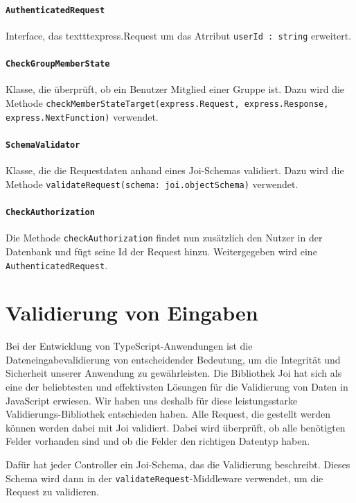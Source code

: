 \documentclass{implementierungsheft}
\begin{document}
\paragraph{\texttt{AuthenticatedRequest}} Interface, das texttt{express.Request} um das Atrribut \texttt{userId : string} erweitert.

\paragraph{\texttt{CheckGroupMemberState}} Klasse, die überprüft, ob ein Benutzer Mitglied einer Gruppe ist. Dazu wird die Methode \texttt{checkMemberStateTarget(express.Request, express.Response, express.NextFunction)} verwendet.

\paragraph{\texttt{SchemaValidator}} Klasse, die die Requestdaten anhand eines Joi-Schemas validiert. Dazu wird die Methode \texttt{validateRequest(schema: joi.objectSchema)} verwendet.

\paragraph{\texttt{CheckAuthorization}} Die Methode \texttt{checkAuthorization} findet nun zusätzlich den Nutzer in der Datenbank und fügt seine Id der Request hinzu. Weitergegeben wird eine \texttt{AuthenticatedRequest}.

\section{Validierung von Eingaben}
Bei der Entwicklung von TypeScript-Anwendungen ist die Dateneingabevalidierung von entscheidender Bedeutung, um die Integrität und Sicherheit unserer Anwendung zu gewährleisten. Die Bibliothek Joi hat sich als eine der beliebtesten und effektivsten Lösungen für die Validierung von Daten in JavaScript erwiesen. Wir haben uns deshalb für diese leistungsstarke Validierungs-Bibliothek entschieden haben.
Alle Request, die gestellt werden können werden dabei mit Joi validiert. Dabei wird überprüft, ob alle benötigten Felder vorhanden sind und ob die Felder den richtigen Datentyp haben.

Dafür hat jeder Controller ein Joi-Schema, das die Validierung beschreibt. Dieses Schema wird dann in der \texttt{validateRequest}-Middleware verwendet, um die Request zu validieren.
\end{document}
